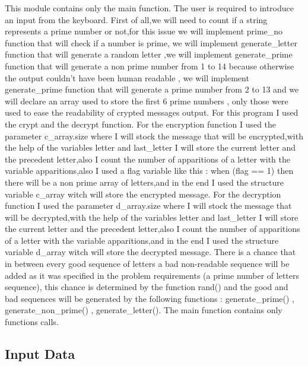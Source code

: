 \documentclass[12]{article}
\begin{document}
This module contains only the main function. The user is required to introduce an input from the keyboard. First of all,we will need to count if a string represents a prime number or not,for this issue we will implement prime\_no function that will check if a number is prime, we will implement generate\_letter function that will generate a random letter ,we will implement generate\_prime function that will generate a non prime number from 1 to 14 because otherwise the output couldn't have been human readable , we will implement generate\_prime function that will generate a prime number from 2 to 13 and we will declare an array used to store the first 6 prime numbers , only those were used to ease the readability of crypted messages output. For this program I used the crypt and the decrypt function. For the encryption function I used the parameter c\_array.size where I will stock the message that will be encrypted,with the help of the variables letter and last\_letter I will store the current letter and the precedent letter,also I count the number of apparitions of a letter with the variable apparitions,also I used a flag variable like this : when (flag == 1) then there will be a non prime array of letters,and in the end I used the structure variable c\_array witch will store the encrypted message. For the decryption function  I used the parameter d\_array.size where I will stock the message that will be decrypted,with the help of the variables letter and last\_letter I will store the current letter and the precedent letter,also I count the number of apparitions of a letter with the variable apparitions,and in the end I used the structure variable d\_array witch will store the decrypted message.
There is a chance that in between every good sequence of letters a bad non-readable sequence will be added as it was specified in the problem requirements (a prime number of letters sequence), this chance is determined by the function rand() and the good and bad sequences will be generated by the following functions : generate\_prime() , generate\_non\_prime() , generate\_letter().
The main function contains only functions calls.  
















\subsection{Input Data}
\textcolor{white}{} 
 
\end{document}

